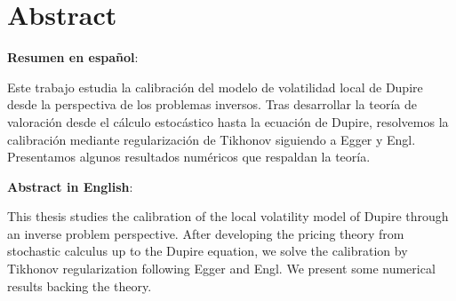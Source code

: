 
\chapter*{Abstract}
\begin{SingleSpace}
\noindent \textbf{Resumen en espa\~nol}:

Este trabajo estudia la calibraci\'on del modelo de volatilidad local de Dupire desde la perspectiva de los problemas inversos.
Tras desarrollar la teor\'ia de valoraci\'on desde el c\'alculo estoc\'astico hasta la ecuaci\'on de Dupire,
resolvemos la calibraci\'on mediante regularizaci\'on de Tikhonov siguiendo a Egger y Engl.
Presentamos algunos resultados num\'ericos que respaldan la teor\'ia.
\end{SingleSpace}
\vspace{2cm}

\begin{SingleSpace}
\noindent \textbf{Abstract in English}:

This thesis studies the calibration of the local volatility model of Dupire through an inverse problem perspective.
After developing the pricing theory from stochastic calculus up to the Dupire equation,
we solve the calibration by Tikhonov regularization following Egger and Engl.
We present some numerical results backing the theory.
\end{SingleSpace}

\vfill
{}

\clearpage
